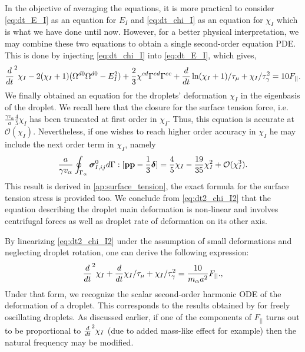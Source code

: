In the objective of averaging the equations, it is more practical to consider \ref{eq:dt_E_I} as an equation for $E_I$ and \ref{eq:dt_chi_I} as an equation for $\chi_I$ which is what we have done until now. 
However, for a better physical interpretation, we may combine these two equations to obtain a single second-order equation PDE. 
This is done by injecting \ref{eq:dt_chi_I} into \ref{eq:dt_E_I}, which gives, 
\begin{equation}
        \ddt^2 \chi_I
        - 2(\chi_I+1)( \Omega^{d0} \Omega^{d0}  - E_I^2) 
        + \frac{2}{3} \chi^{cd}
        \Gamma^{ed}\Gamma^{ec}
    + \ddt \ln(\chi_I+1) /\tau_\mu
    + \chi_I/\tau_\gamma^2
    = 10 F_{||}. 
    \label{eq:dt2_chi_I2}
\end{equation} 
We finally obtained an equation for the droplets' deformation $\chi_I$ in the eigenbasis of the droplet.
We recall here that the closure for the surface tension force, i.e. $\frac{\gamma v_\alpha }{a} \frac{4  }{5} \chi_I$ has been truncated at first order in $\chi_I$.
Thus, this equation is accurate at $\mathcal{O}(\chi_I)$.
Nevertheless, if one wishes to reach higher order accuracy in $\chi_I$ he may include the next order term in $\chi_I$, namely 
\begin{equation*}
    \frac{a}{\gamma v_\alpha}\oint_{\Gamma_{\alpha}} \bm\sigma_{I,ij}^0 d\Gamma : [\textbf{pp} - \frac{1}{3} \bm\delta]
    = \frac{4}{5} \chi_I - \frac{19}{35}\chi_I^2 + \mathcal{O}(\chi_I^3). 
\end{equation*}
This result is derived in \ref{ap:surface_tension}, the exact formula for the surface tension stress is provided too.  
We conclude from \ref{eq:dt2_chi_I2} that the equation describing the droplet main deformation is non-linear and involves centrifugal forces as well as droplet rate of deformation on its other axis. 


By linearizing \ref{eq:dt2_chi_I2} under the assumption of small deformations and neglecting droplet rotation, one can derive the following expression:
\begin{equation}
    \ddt^2 \chi_I
    + \ddt \chi_I/\tau_\mu
    + 
     \chi_I /\tau_\gamma^2
    = \frac{10}{m_\alpha a^2}F_{||}. ,
    \label{eq:lamb_like_model}
\end{equation} 
Under that form, we recognize the scalar second-order harmonic ODE of the deformation of a droplet.
This corresponds to the results obtained by  \citet{lamb1924hydrodynamics} for freely oscillating droplets. 
As discussed earlier, if one of the components of $F_{||}$ turns out to be proportional to $\frac{d}{dt}^2 \chi_I$ (due to added mass-like effect for example) then the natural frequency may be modified. 

